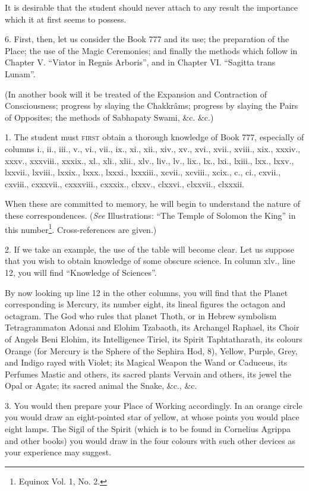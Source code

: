 It is desirable that the student should never attach to any result the importance which it at first seems to possess.

6. First, then, let us consider the Book 777 and its use; the preparation of the Place; the use of the Magic Ceremonies; and finally the methods which follow in Chapter V. \enquote{Viator in Regnis Arboris}, and in Chapter VI. \enquote{Sagitta trans Lunam}.

(In another book will it be treated of the Expansion and Contraction of Consciousness; progress by slaying the Chakkr\^{a}ms; progress by slaying the Pairs of Opposites; the methods of Sabhapaty Swami, \&c. \&c.)




1. The student must \textsc{first} obtain a thorough knowledge of Book 777, especially of columns i., ii., iii., v., vi., vii., ix., xi., xii., xiv., xv., xvi., xvii., xviii., xix., xxxiv., xxxv., xxxviii., xxxix., xl., xli., xlii., xlv., liv., lv., lix., lx., lxi., lxiii., lxx., lxxv., lxxvii., lxviii., lxxix., lxxx., lxxxi., lxxxiii., xcvii., xcviii., xcix., c., ci., cxvii., cxviii., cxxxvii., cxxxviii., cxxxix., clxxv., clxxvi., clxxvii., clxxxii.

When these are committed to memory, he will begin to understand the nature of these correspondences. (\textit{See} Illustrations: \enquote{The Temple of Solomon the King} in this number\footnote{Equinox Vol. 1, No. 2.}. Cross-references are given.)

2. If we take an example, the use of the table will become clear. Let us suppose that you wish to obtain knowledge of some obscure science. In column xlv., line 12, you will find \enquote{Knowledge of Sciences}.

By now looking up line 12 in the other columns, you will find that the Planet corresponding is Mercury, its number eight, its lineal figures the octagon and octagram. The God who rules that planet Thoth, or in Hebrew symbolism Tetragrammaton Adonai and Elohim Tzabaoth, its Archangel Raphael, its Choir of Angels Beni Elohim, its Intelligence Tiriel, its Spirit Taphtatharath, its colours Orange (for Mercury is the Sphere of the Sephira Hod, 8), Yellow, Purple, Grey, and Indigo rayed with Violet; its Magical Weapon the Wand or Caduceus, its Perfumes Mastic and others, its sacred plants Vervain and others, its jewel the Opal or Agate; its sacred animal the Snake, \&c., \&c.

3. You would then prepare your Place of Working accordingly. In an orange circle you would draw an eight-pointed star of yellow, at whose points you would place eight lamps. The Sigil of the Spirit (which is to be found in Cornelius Agrippa and other books) you would draw in the four colours with such other devices as your experience may suggest.

